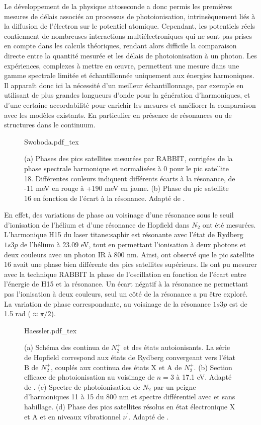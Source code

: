 Le développement de la physique attoseconde a donc permis les premières mesures de délais associés au processus de photoionisation, intrinsèquement liés à la diffusion de l'électron sur le potentiel atomique. Cependant, les potentiels réels contiennent de nombreuses interactions multiélectroniques qui ne sont pas prises en compte dans les calculs théoriques, rendant alors difficile la comparaison directe entre la quantité mesurée et les délais de photoionisation à un photon. Les expériences, complexes à mettre en \oe{uvre}, permettent une mesure dans une gamme spectrale limitée et échantillonnée uniquement aux énergies harmoniques. Il apparaît donc ici la nécessité d'un meilleur échantillonnage, par exemple en utilisant de plus grandes longueurs d'onde pour la génération d'harmoniques, et d'une certaine accordabilité pour enrichir les mesures et améliorer la comparaison avec les modèles existants. En particulier en présence de résonances ou de structures dans le continuum.

\begin{figure}
\centering
\def\svgwidth{0.8\textwidth}
{Swoboda.pdf_tex}
\caption{(a) Phases des pics satellites mesurées par RABBIT, corrigées de la phase spectrale harmonique et normalisées à 0 pour le pic satellite 18. Différentes couleurs indiquent différents écarts à la résonance, de -11 meV en rouge à +190 meV en jaune. (b) Phase du pic satellite 16 en fonction de l'écart à la résonance. Adapté de .}
\label{fig:Swoboda}
\end{figure}

En effet, des variations de phase au voisinage d'une résonance sous le seuil d'ionisation de l'hélium et d'une résonance de Hopfield dans $N_2$ ont été mesurées. L'harmonique H15 du laser titane:saphir est résonante avec l'état de Rydberg $1s3p$ de l'hélium à 23.09 eV, tout en permettant l'ionisation à deux photons et deux couleurs avec un photon IR à 800 nm. Ainsi,  ont observé que le pic satellite 16 avait une phase bien différente des pics satellites supérieurs. Ils ont pu mesurer avec la technique RABBIT la phase de l'oscillation en fonction de l'écart entre l'énergie de H15 et la résonance. Un écart négatif à la résonance ne permettant pas l'ionisation à deux couleurs, seul un côté de la résonance a pu être exploré. La variation de phase correspondante, au voisinage de la résonance $1s3p$ est de 1.5 rad ($\approx \pi/2$).

\begin{figure}
\centering
\def\svgwidth{\textwidth}
{Haessler.pdf_tex}
\caption{(a) Schéma des continua de $N_2^+$ et des états autoionisants. La série de Hopfield correspond aux états de Rydberg convergeant vers l'état B de $N_2^+$, couplés aux continua des états X et A de $N_2^+$. (b) Section efficace de photoionisation au voisinage de $n=3$ à 17.1 eV. Adapté de . (c) Spectre de photoionisation de $N_2$ par un peigne d'harmoniques 11 à 15 du 800 nm et spectre différentiel avec et sans habillage. (d) Phase des pics satellites résolus en état électronique X et A et en niveaux vibrationnel $\nu^{'}$. Adapté de .}
\label{fig:Haessler}
\end{figure}

